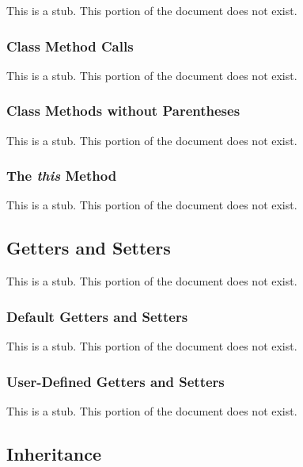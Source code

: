 This is a stub.  This portion of the document does not exist.

\subsubsection{Class Method Calls}
\label{Class_Method_Calls}

This is a stub.  This portion of the document does not exist.

\subsubsection{Class Methods without Parentheses}
\label{Class_Methods_without_Parentheses}

This is a stub.  This portion of the document does not exist.

\subsubsection{The {\em this} Method}
\label{The_em_this_Method}

This is a stub.  This portion of the document does not exist.

\subsection{Getters and Setters}
\label{Getters_and_Setters}

This is a stub.  This portion of the document does not exist.

\subsubsection{Default Getters and Setters}
\label{Default_Getters_and_Setters}

This is a stub.  This portion of the document does not exist.

\subsubsection{User-Defined Getters and Setters}
\label{User-Defined_Getters_and_Setters}

This is a stub.  This portion of the document does not exist.

\subsection{Inheritance}
\label{Inheritance}


